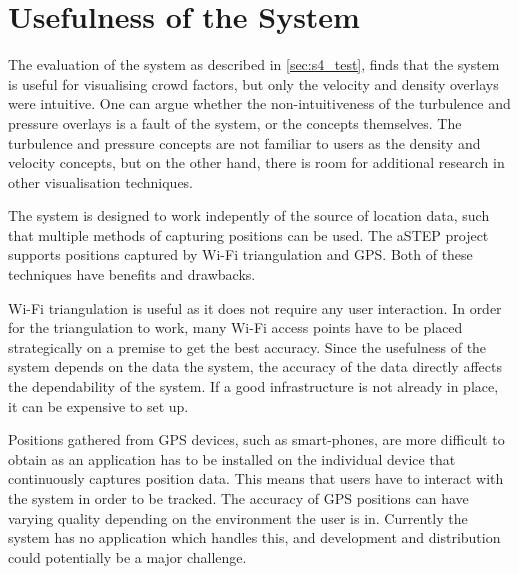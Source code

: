 \section{Usefulness of the System}
The evaluation of the system as described in \cref{sec:s4_test}, finds that the system is useful for visualising crowd factors, but only the velocity and density overlays were intuitive. One can argue whether the non-intuitiveness of the turbulence and pressure overlays is a fault of the system, or the concepts themselves. The turbulence and pressure concepts are not familiar to users as the density and velocity concepts, but on the other hand, there is room for additional research in other visualisation techniques. 


The system is designed to work indepently of the source of location data, such that multiple methods of capturing positions can be used. The aSTEP project supports positions captured by Wi-Fi triangulation and GPS. Both of these techniques have benefits and drawbacks.

Wi-Fi triangulation is useful as it does not require any user interaction. In order for the triangulation to work, many Wi-Fi access points have to be placed strategically on a premise to get the best accuracy. Since the usefulness of the system depends on the data the system, the accuracy of the data directly affects the dependability of the system. If a good infrastructure is not already in place, it can be expensive to set up.

Positions gathered from GPS devices, such as smart-phones, are more difficult to obtain as an application has to be installed on the individual device that continuously captures position data. This means that users have to interact with the system in order to be tracked. The accuracy of GPS positions can have varying quality depending on the environment the user is in. Currently the system has no application which handles this, and development and distribution could potentially be a major challenge.
